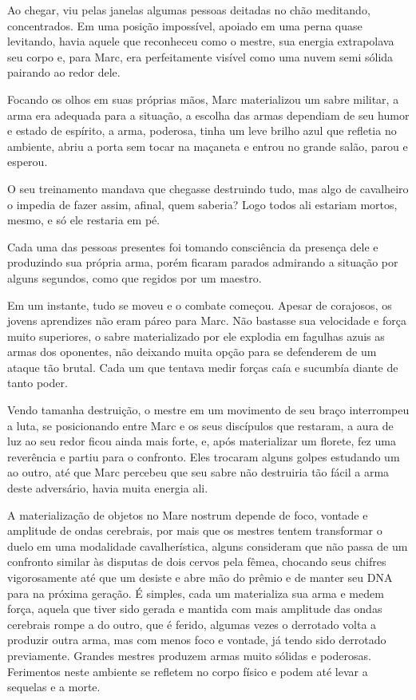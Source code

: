 Ao chegar, viu pelas janelas algumas pessoas deitadas no chão meditando,
concentrados. Em uma posição impossível, apoiado em uma perna quase
levitando, havia aquele que reconheceu como o mestre, sua energia
extrapolava seu corpo e, para Marc, era perfeitamente visível como uma
nuvem semi sólida pairando ao redor dele.

Focando os olhos em suas próprias mãos, Marc materializou um sabre
militar, a arma era adequada para a situação, a escolha das armas
dependiam de seu humor e estado de espírito, a arma, poderosa, tinha um
leve brilho azul que refletia no ambiente, abriu a porta sem tocar na
maçaneta e entrou no grande salão, parou e esperou.

O seu treinamento mandava que chegasse destruindo tudo, mas algo de
cavalheiro o impedia de fazer assim, afinal, quem saberia? Logo todos
ali estariam mortos, mesmo, e só ele restaria em pé.

Cada uma das pessoas presentes foi tomando consciência da presença dele
e produzindo sua própria arma, porém ficaram parados admirando a
situação por alguns segundos, como que regidos por um maestro.

Em um instante, tudo se moveu e o combate começou. Apesar de corajosos,
os jovens aprendizes não eram páreo para Marc. Não bastasse sua
velocidade e força muito superiores, o sabre materializado por ele
explodia em fagulhas azuis as armas dos oponentes, não deixando muita
opção para se defenderem de um ataque tão brutal. Cada um que tentava
medir forças caía e sucumbía diante de tanto poder.

Vendo tamanha destruição, o mestre em um movimento de seu braço
interrompeu a luta, se posicionando entre Marc e os seus discípulos que
restaram, a aura de luz ao seu redor ficou ainda mais forte, e, após
materializar um florete, fez uma reverência e partiu para o confronto.
Eles trocaram alguns golpes estudando um ao outro, até que Marc percebeu
que seu sabre não destruiria tão fácil a arma deste adversário, havia
muita energia ali.

A materialização de objetos no Mare nostrum depende de foco, vontade e
amplitude de ondas cerebrais, por mais que os mestres tentem transformar
o duelo em uma modalidade cavalherística, alguns consideram que não
passa de um confronto similar às disputas de dois cervos pela fêmea,
chocando seus chifres vigorosamente até que um desiste e abre mão do
prêmio e de manter seu DNA para na próxima geração. É simples, cada um
materializa sua arma e medem força, aquela que tiver sido gerada e
mantida com mais amplitude das ondas cerebrais rompe a do outro, que é
ferido, algumas vezes o derrotado volta a produzir outra arma, mas com
menos foco e vontade, já tendo sido derrotado previamente. Grandes
mestres produzem armas muito sólidas e poderosas. Ferimentos neste
ambiente se refletem no corpo físico e podem até levar a sequelas e a
morte.

